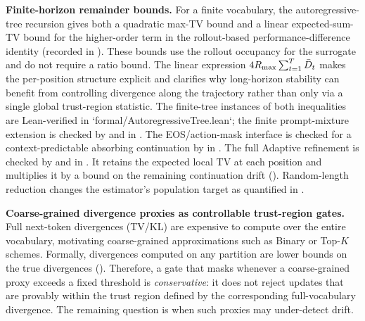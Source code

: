 \textbf{Finite-horizon remainder bounds.} For a finite vocabulary, the autoregressive-tree recursion gives both a quadratic
max-TV bound and a linear expected-sum-TV bound for the higher-order term in the rollout-based performance-difference identity
(recorded in ). These bounds use the rollout occupancy for the surrogate and do not require a ratio bound.
The linear expression
$4R_{\max}\sum_{t=1}^{T}\bar{D}_t$ makes the per-position structure explicit and clarifies why long-horizon stability can benefit
from controlling divergence along the trajectory rather than only via a single global trust-region statistic. The finite-tree
instances of both inequalities are Lean-verified in `formal/AutoregressiveTree.lean`; the finite prompt-mixture extension is checked
by  and  in . The EOS/action-mask interface is
checked for a context-predictable absorbing continuation by  in .
The full Adaptive refinement is checked by
 and 
in . It retains the expected local TV at
each position and multiplies it by a bound on the remaining continuation
drift (). Random-length reduction changes the
estimator's population target as quantified in .

\textbf{Coarse-grained divergence proxies as controllable trust-region gates.} Full next-token divergences (TV/KL) are expensive to
compute over the entire vocabulary, motivating coarse-grained approximations such as Binary or Top-$K$ schemes. Formally, divergences
computed on any partition are lower bounds on the true divergences (). Therefore, a gate that masks whenever
a coarse-grained proxy exceeds a fixed threshold is \emph{conservative}: it does not reject updates that are provably within the trust
region defined by the corresponding full-vocabulary divergence. The remaining question is when such proxies may under-detect drift.

